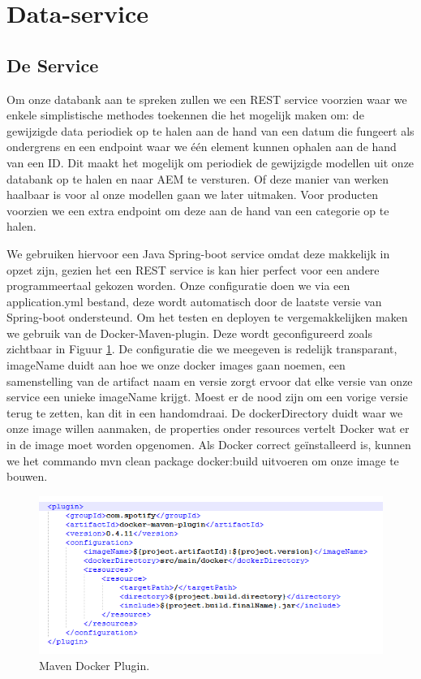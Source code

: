 
	\section{Data-service}
	
	\subsection{De Service}
	Om onze databank aan te spreken zullen we een REST service voorzien waar we enkele simplistische methodes toekennen die het mogelijk maken om: de gewijzigde data periodiek op te halen aan de hand van een datum die fungeert als ondergrens en een endpoint waar we \'e\'en element kunnen ophalen aan de hand van een ID. Dit maakt het mogelijk om periodiek de gewijzigde modellen uit onze databank op te halen en naar AEM te versturen. Of deze manier van werken haalbaar is voor al onze modellen gaan we later uitmaken. Voor producten voorzien we een extra endpoint om deze aan de hand van een categorie op te halen. 
	\par
	We gebruiken hiervoor een Java Spring-boot service omdat deze makkelijk in opzet zijn, gezien het een REST service is kan hier perfect voor een andere programmeertaal gekozen worden. Onze configuratie doen we via een application.yml bestand, deze wordt automatisch door de laatste versie van Spring-boot ondersteund. Om het testen en deployen te vergemakkelijken maken we gebruik van de Docker-Maven-plugin. Deze wordt geconfigureerd zoals zichtbaar in Figuur \ref{fig:docker-plugin}. De configuratie die we meegeven is redelijk transparant, imageName duidt aan hoe we onze docker images gaan noemen, een samenstelling van de artifact naam en versie zorgt ervoor dat elke versie van onze service een unieke imageName krijgt. Moest er de nood zijn om een vorige versie terug te zetten, kan dit in een handomdraai. De dockerDirectory duidt waar we onze image willen aanmaken, de properties onder resources vertelt Docker wat er in de image moet worden opgenomen. Als Docker correct ge\"installeerd is, kunnen we het commando \textquotedbl mvn clean package docker:build\textquotedbl{} uitvoeren om onze image te bouwen.
	
	\begin{figure}[h!]
		\centering
  		\includegraphics[width=\linewidth]{images/maven-plugin.PNG}
  		\caption{Maven Docker Plugin.}
  		\label{fig:docker-plugin}
	\end{figure}

